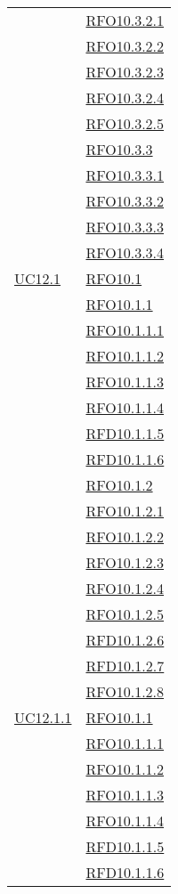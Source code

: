 \begin{longtable}{|>{\centering}m{5cm}|m{5cm}<{\centering}|}
& \hyperlink{RFO10.3.2.1}{RFO10.3.2.1}\\
& \hyperlink{RFO10.3.2.2}{RFO10.3.2.2}\\
& \hyperlink{RFO10.3.2.3}{RFO10.3.2.3}\\
& \hyperlink{RFO10.3.2.4}{RFO10.3.2.4}\\
& \hyperlink{RFO10.3.2.5}{RFO10.3.2.5}\\
& \hyperlink{RFO10.3.3}{RFO10.3.3}\\
& \hyperlink{RFO10.3.3.1}{RFO10.3.3.1}\\
& \hyperlink{RFO10.3.3.2}{RFO10.3.3.2}\\
& \hyperlink{RFO10.3.3.3}{RFO10.3.3.3}\\
& \hyperlink{RFO10.3.3.4}{RFO10.3.3.4}\\\hline

\hyperlink{UC12.1}{UC12.1} 
& \hyperlink{RFO10.1}{RFO10.1}\\
& \hyperlink{RFO10.1.1}{RFO10.1.1}\\
& \hyperlink{RFO10.1.1.1}{RFO10.1.1.1}\\
& \hyperlink{RFO10.1.1.2}{RFO10.1.1.2}\\
& \hyperlink{RFO10.1.1.3}{RFO10.1.1.3}\\
& \hyperlink{RFO10.1.1.4}{RFO10.1.1.4}\\
& \hyperlink{RFD10.1.1.5}{RFD10.1.1.5}\\
& \hyperlink{RFD10.1.1.6}{RFD10.1.1.6}\\
& \hyperlink{RFO10.1.2}{RFO10.1.2}\\
& \hyperlink{RFO10.1.2.1}{RFO10.1.2.1}\\
& \hyperlink{RFO10.1.2.2}{RFO10.1.2.2}\\
& \hyperlink{RFO10.1.2.3}{RFO10.1.2.3}\\
& \hyperlink{RFO10.1.2.4}{RFO10.1.2.4}\\
& \hyperlink{RFO10.1.2.5}{RFO10.1.2.5}\\
& \hyperlink{RFD10.1.2.6}{RFD10.1.2.6}\\
& \hyperlink{RFD10.1.2.7}{RFD10.1.2.7}\\
& \hyperlink{RFO10.1.2.8}{RFO10.1.2.8}\\\hline

\hyperlink{UC12.1.1}{UC12.1.1} 
& \hyperlink{RFO10.1.1}{RFO10.1.1}\\
& \hyperlink{RFO10.1.1.1}{RFO10.1.1.1}\\
& \hyperlink{RFO10.1.1.2}{RFO10.1.1.2}\\
& \hyperlink{RFO10.1.1.3}{RFO10.1.1.3}\\
& \hyperlink{RFO10.1.1.4}{RFO10.1.1.4}\\
& \hyperlink{RFD10.1.1.5}{RFD10.1.1.5}\\
& \hyperlink{RFD10.1.1.6}{RFD10.1.1.6}\\\hline


\end{longtable}
